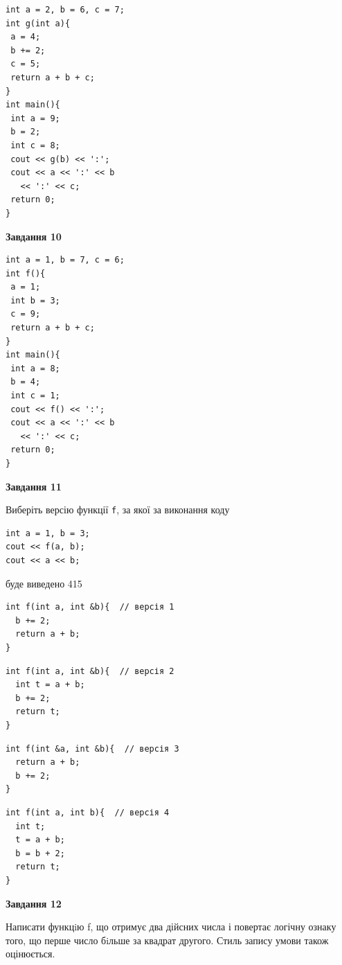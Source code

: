 \documentclass[12pt, ukrainian]{article}
\def\code#1{\Verb!#1!}
\begin{document}
{\begin {large}
\begin{minipage}[t]{7.0cm}
\begin{verbatim}
int a = 2, b = 6, c = 7;
int g(int a){
 a = 4;
 b += 2;
 c = 5;
 return a + b + c;
}
int main(){
 int a = 9;
 b = 2;
 int c = 8;
 cout << g(b) << ':';
 cout << a << ':' << b 
   << ':' << c;
 return 0;
}
\end{verbatim}



\begin{center}
\textbf{Завдання 10}
\end{center}
\vspace{-8mm}

\begin{verbatim}
int a = 1, b = 7, c = 6;
int f(){
 a = 1;
 int b = 3;
 c = 9;
 return a + b + c;
}
int main(){
 int a = 8;
 b = 4;
 int c = 1;
 cout << f() << ':';
 cout << a << ':' << b 
   << ':' << c;
 return 0;
}
\end{verbatim}

\end{minipage}
\vline \hspace{1mm}
\begin{minipage}[t]{11.0cm}

\begin{center}
\textbf{Завдання 11}
\end{center}
Виберіть версію функції \code{f}, за якої за виконання коду
\begin{verbatim}
int a = 1, b = 3;
cout << f(a, b);
cout << a << b;
\end{verbatim}

буде виведено 415

\begin{verbatim}
int f(int a, int &b){  // версія 1
  b += 2;
  return a + b;
}
\end{verbatim}

\vspace{-8mm}\begin{verbatim}
int f(int a, int &b){  // версія 2
  int t = a + b;
  b += 2;
  return t;
}
\end{verbatim}

\vspace{-8mm}\begin{verbatim}
int f(int &a, int &b){  // версія 3
  return a + b;
  b += 2;
}
\end{verbatim}

\vspace{-8mm}\begin{verbatim}
int f(int a, int b){  // версія 4
  int t;
  t = a + b;
  b = b + 2;
  return t;
}
\end{verbatim}



\begin{center}
\textbf{Завдання 12}
\end{center}

Написати функцiю f, що отримує два дійсних числа і повертає логічну ознаку того, що перше число бiльше за квадрат другого. Стиль запису умови також оцінюється.\par

\end{minipage}

\end {large}}
\end{document}
